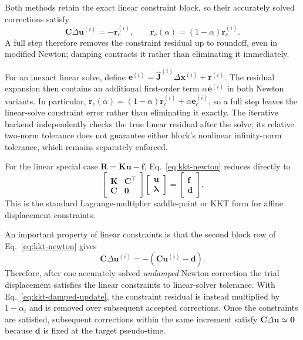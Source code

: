 \documentclass[11pt,a4paper]{article}
\newcommand{\vct}[1]{\mathbf{#1}}
\begin{document}
Both methods retain the exact linear constraint block, so their accurately solved corrections satisfy
\begin{equation}
\vct C\Delta\vct u^{(i)}=-\vct r_c^{(i)},\qquad
\vct r_c(\alpha)=(1-\alpha)\vct r_c^{(i)}.
\end{equation}
A full step therefore removes the constraint residual up to roundoff, even in modified Newton; damping contracts it rather than eliminating it immediately.

For an inexact linear solve, define $\vct e^{(i)}=
\widehat{\vct J}^{(i)}\Delta\vct x^{(i)}+\vct r^{(i)}$.
The residual expansion then contains an additional first-order term
$\alpha\vct e^{(i)}$ in both Newton variants. In particular,
$\vct r_c(\alpha)=(1-\alpha)\vct r_c^{(i)}+\alpha\vct e_c^{(i)}$,
so a full step leaves the linear-solve constraint error rather than eliminating it exactly.
The iterative backend independently checks the true linear residual after the solve;
its relative two-norm tolerance does not guarantee either block's nonlinear infinity-norm tolerance,
which remains separately enforced.

For the linear special case $\vct R=\vct K\vct u-\vct f$, Eq.~\eqref{eq:kkt-newton} reduces directly to
\begin{equation}
\boxed{
\begin{bmatrix}
\vct K & \vct C^\top\\
\vct C & \vct0
\end{bmatrix}
\begin{bmatrix}
\vct u\\
\vct\lambda
\end{bmatrix}
=
\begin{bmatrix}
\vct f\\
\vct d
\end{bmatrix}.
}
\label{eq:kkt-linear}
\end{equation}
This is the standard Lagrange-multiplier saddle-point or KKT form for affine displacement constraints.

An important property of linear constraints is that the second block row of Eq.~\eqref{eq:kkt-newton} gives
\begin{equation}
\vct C\Delta\vct u^{(i)}
=-(\vct C\vct u^{(i)}-\vct d).
\end{equation}
Therefore, after one accurately solved \emph{undamped} Newton correction the trial displacement satisfies the linear constraints to linear-solver tolerance. With Eq.~\eqref{eq:kkt-damped-update}, the constraint residual is instead multiplied by $1-\alpha_i$ and is removed over subsequent accepted corrections. Once the constraints are satisfied, subsequent corrections within the same increment satisfy $\vct C\Delta\vct u\simeq\vct0$ because $\vct d$ is fixed at the target pseudo-time.
\end{document}

